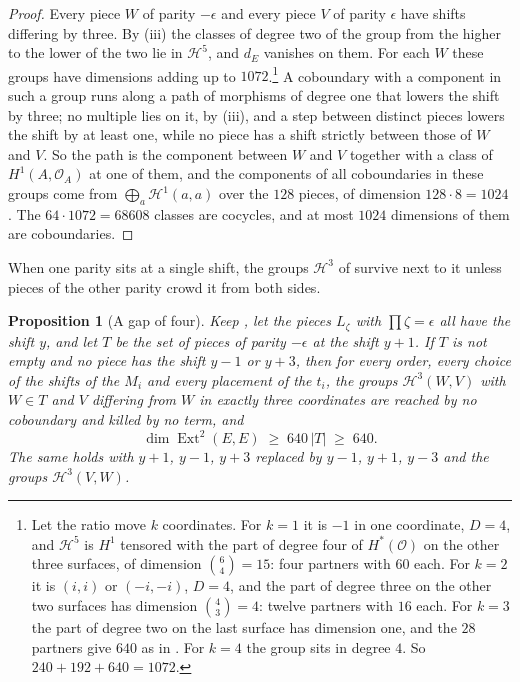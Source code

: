 \documentclass[11pt,reqno]{amsart}
\theoremstyle{plain}
\newtheorem{proposition}[theorem]{Proposition}
\theoremstyle{definition}
\theoremstyle{remark}
\newcommand{\cO}{\mathcal{O}}
\newcommand{\cH}{\mathcal{H}}
\DeclareMathOperator{\Ext}{Ext}
\begin{document}
\begin{proof}
Every piece $W$ of parity $-\epsilon$ and every piece $V$ of parity $\epsilon$
have shifts differing by three. By (iii) the classes
of degree two of the group from the higher to the lower of the two lie in
$\cH^{5}$, and $d_{E}$ vanishes on them. For each $W$ these groups have
dimensions adding up to $1072$.\footnote{Let the ratio move $k$
coordinates. For $k=1$ it is $-1$ in one coordinate, $D=4$, and $\cH^{5}$
is $H^{1}$ tensored with the part of degree four of $H^{*}(\cO)$ on the
other three surfaces, of dimension $\binom{6}{4}=15$: four partners with
$60$ each. For $k=2$ it is $(i,i)$ or $(-i,-i)$, $D=4$, and the part of
degree three on the other two surfaces has dimension $\binom43=4$: twelve
partners with $16$ each. For $k=3$ the part of degree two on the last surface
has dimension one, and the $28$ partners give $640$ as in
. For $k=4$ the group sits in degree $4$. So
$240+192+640=1072$.} A coboundary with a component in such a group runs
along a path of morphisms of degree one that lowers the shift by three;
no multiple lies on it, by (iii), and a step between
distinct pieces lowers the shift by at least one, while no piece has a shift
strictly between those of $W$ and $V$. So the path is the component between
$W$ and $V$ together with a class of $H^{1}(A,\cO_{A})$ at one of them, and
the components of all coboundaries in these groups come from
$\bigoplus_{a}\cH^{1}(a,a)$ over the $128$ pieces, of dimension
$128\cdot8=1024$. The $64\cdot1072=68608$ classes are cocycles, and at most
$1024$ dimensions of them are coboundaries.
\end{proof}

When one parity sits at a single shift, the groups $\cH^{3}$ of
 survive next to it unless pieces of the other
parity crowd it from both sides.

\begin{proposition}[A gap of four]\label{prop:efourgap}
Keep , let the pieces $L_{\zeta}$ with
$\prod\zeta=\epsilon$ all have the shift $y$, and let $T$ be the set of
pieces of parity $-\epsilon$ at the shift $y+1$. If $T$ is not empty and no
piece has the shift $y-1$ or $y+3$, then for every order, every choice of
the shifts of the $M_{i}$ and every placement of the $t_{i}$, the groups
$\cH^{3}(W,V)$ with $W\in T$ and $V$ differing from $W$ in exactly three
coordinates are reached by no coboundary and killed by no term, and
\[
  \dim\Ext^{2}(E,E)\;\ge\;640\,|T|\;\ge\;640 .
\]
The same holds with $y+1$, $y-1$, $y+3$ replaced by $y-1$, $y+1$, $y-3$ and
the groups $\cH^{3}(V,W)$.
\end{proposition}
\end{document}
